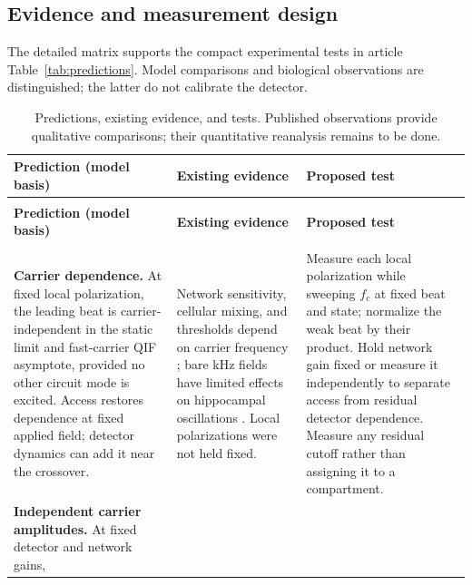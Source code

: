 \documentclass[11pt,a4paper]{article}
\providecommand{\DIFaddtex}[1]{{\protect\color{blue} \sf #1}} %
\providecommand{\DIFadd}[1]{\texorpdfstring{\DIFaddtex{#1}}{#1}} %
\begin{document}
\subsection{\DIFadd{Evidence and measurement design}}\label{supp:prediction-evidence}
\DIFadd{The detailed matrix supports the compact experimental tests in article
Table~\ref{tab:predictions}. Model comparisons and biological observations
are distinguished; the latter do not calibrate the detector.
}\begingroup\small
\renewcommand{\arraystretch}{1.15}
\begin{longtable}{@{}>{\raggedright\arraybackslash}p{}
 >{\raggedright\arraybackslash}p{}
 >{\raggedright\arraybackslash}p{}@{}}
\caption{\DIFadd{Predictions, existing evidence, and tests. Published observations provide
qualitative comparisons; their quantitative reanalysis remains to be done.}}
\label{tab:prediction-evidence}\\
\toprule
\DIFadd{\textbf{Prediction (model basis)} }& \DIFadd{\textbf{Existing evidence} }& \DIFadd{\textbf{Proposed test} }\\
\midrule\endfirsthead
\multicolumn{3}{@{}l}{\textit{Table \thetable\ continued}}\\
\toprule
\DIFadd{\textbf{Prediction (model basis)} }& \DIFadd{\textbf{Existing evidence} }& \DIFadd{\textbf{Proposed test} }\\
\midrule\endhead
\midrule\multicolumn{3}{r@{}}{\textit{Continued on next page}}\\\endfoot
\bottomrule\endlastfoot
\DIFadd{\textbf{Carrier dependence.} At fixed local polarization, the leading beat is
carrier-independent in the static limit and fast-carrier QIF asymptote, provided
no other circuit mode is excited. Access restores dependence at fixed applied
field; detector dynamics can add it near the crossover.
}& \DIFadd{Network sensitivity, cellular mixing, and thresholds depend on carrier frequency
\cite{esmaeilpour2021,luff2024mixer,opancar2025,peripheral2023}; bare kHz fields
have limited effects on hippocampal oscillations \cite{esmaeilpour2020}.
Local polarizations were not held fixed.
}& \DIFadd{Measure each local polarization while sweeping $f_c$ at fixed beat and state;
normalize the weak beat by their product. Hold network gain fixed or measure it
independently to separate access from residual detector dependence. Measure any
residual cutoff rather than assigning it to a compartment. }\\[4pt]
\DIFadd{\textbf{Independent carrier amplitudes.} At fixed detector and network gains,
}
\end{longtable}
\end{document}
